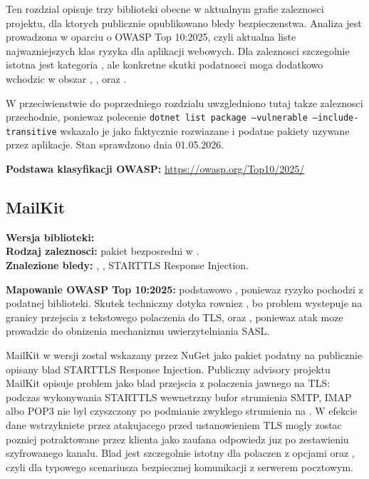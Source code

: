 \documentclass[12pt,a4paper]{article}
\begin{document}
Ten rozdzial opisuje trzy biblioteki obecne w aktualnym grafie zaleznosci projektu, dla ktorych publicznie opublikowano bledy bezpieczenstwa. Analiza jest prowadzona w oparciu o OWASP Top 10:2025, czyli aktualna liste najwazniejszych klas ryzyka dla aplikacji webowych. Dla zaleznosci szczegolnie istotna jest kategoria , ale konkretne skutki podatnosci moga dodatkowo wchodzic w obszar , ,  oraz .

W przeciwienstwie do poprzedniego rozdzialu uwzgledniono tutaj takze zaleznosci przechodnie, poniewaz polecenie \texttt{dotnet list package --vulnerable --include-transitive} wskazalo je jako faktycznie rozwiazane i podatne pakiety uzywane przez aplikacje. Stan sprawdzono dnia 01.05.2026.

\textbf{Podstawa klasyfikacji OWASP:} \url{https://owasp.org/Top10/2025/}

\subsection{MailKit}

\textbf{Wersja biblioteki:} \\
\textbf{Rodzaj zaleznosci:} pakiet bezposredni w .\\
\textbf{Znalezione bledy:} , , STARTTLS Response Injection.

\textbf{Mapowanie OWASP Top 10:2025:} podstawowo , poniewaz ryzyko pochodzi z podatnej biblioteki. Skutek techniczny dotyka rowniez , bo problem wystepuje na granicy przejscia z tekstowego polaczenia do TLS, oraz , poniewaz atak moze prowadzic do obnizenia mechanizmu uwierzytelniania SASL.

MailKit w wersji  zostal wskazany przez NuGet jako pakiet podatny na publicznie opisany blad STARTTLS Response Injection. Publiczny advisory projektu MailKit opisuje problem jako blad przejscia z polaczenia jawnego na TLS: podczas wykonywania STARTTLS wewnetrzny bufor strumienia SMTP, IMAP albo POP3 nie byl czyszczony po podmianie zwyklego strumienia na . W efekcie dane wstrzykniete przez atakujacego przed ustanowieniem TLS mogly zostac pozniej potraktowane przez klienta jako zaufana odpowiedz juz po zestawieniu szyfrowanego kanalu. Blad jest szczegolnie istotny dla polaczen z opcjami  oraz , czyli dla typowego scenariusza bezpiecznej komunikacji z serwerem pocztowym.
\end{document}
